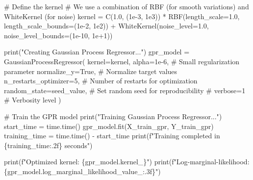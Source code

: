 \documentclass[
  letterpaper,
  DIV=11,
  numbers=noendperiod]{scrreprt}
\newenvironment{Shaded}{\begin{snugshade}}{\end{snugshade}}
\newcommand{\BuiltInTok}[1]{\textcolor[rgb]{0.00,0.23,0.31}{#1}}
\newcommand{\CommentTok}[1]{\textcolor[rgb]{0.37,0.37,0.37}{#1}}
\newcommand{\DecValTok}[1]{\textcolor[rgb]{0.68,0.00,0.00}{#1}}
\newcommand{\FloatTok}[1]{\textcolor[rgb]{0.68,0.00,0.00}{#1}}
\newcommand{\NormalTok}[1]{\textcolor[rgb]{0.00,0.23,0.31}{#1}}
\newcommand{\OperatorTok}[1]{\textcolor[rgb]{0.37,0.37,0.37}{#1}}
\newcommand{\SpecialCharTok}[1]{\textcolor[rgb]{0.37,0.37,0.37}{#1}}
\newcommand{\SpecialStringTok}[1]{\textcolor[rgb]{0.13,0.47,0.30}{#1}}
\newcommand{\StringTok}[1]{\textcolor[rgb]{0.13,0.47,0.30}{#1}}
\newcommand{\VariableTok}[1]{\textcolor[rgb]{0.07,0.07,0.07}{#1}}
\begin{document}
\begin{Shaded}
\begin{Highlighting}[]
\CommentTok{\# Define the kernel}
\CommentTok{\# We use a combination of RBF (for smooth variations) and WhiteKernel (for noise)}
\NormalTok{kernel }\OperatorTok{=}\NormalTok{ C(}\FloatTok{1.0}\NormalTok{, (}\FloatTok{1e{-}3}\NormalTok{, }\FloatTok{1e3}\NormalTok{)) }\OperatorTok{*}\NormalTok{ RBF(length\_scale}\OperatorTok{=}\FloatTok{1.0}\NormalTok{, length\_scale\_bounds}\OperatorTok{=}\NormalTok{(}\FloatTok{1e{-}2}\NormalTok{, }\FloatTok{1e2}\NormalTok{)) }\OperatorTok{+}\NormalTok{ WhiteKernel(noise\_level}\OperatorTok{=}\FloatTok{1.0}\NormalTok{, noise\_level\_bounds}\OperatorTok{=}\NormalTok{(}\FloatTok{1e{-}10}\NormalTok{, }\FloatTok{1e+1}\NormalTok{))}

\BuiltInTok{print}\NormalTok{(}\StringTok{"Creating Gaussian Process Regressor..."}\NormalTok{)}
\NormalTok{gpr\_model }\OperatorTok{=}\NormalTok{ GaussianProcessRegressor(}
\NormalTok{    kernel}\OperatorTok{=}\NormalTok{kernel,}
\NormalTok{    alpha}\OperatorTok{=}\FloatTok{1e{-}6}\NormalTok{,  }\CommentTok{\# Small regularization parameter}
\NormalTok{    normalize\_y}\OperatorTok{=}\VariableTok{True}\NormalTok{,  }\CommentTok{\# Normalize target values}
\NormalTok{    n\_restarts\_optimizer}\OperatorTok{=}\DecValTok{5}\NormalTok{,  }\CommentTok{\# Number of restarts for optimization}
\NormalTok{    random\_state}\OperatorTok{=}\NormalTok{seed\_value,  }\CommentTok{\# Set random seed for reproducibility}
    \CommentTok{\# verbose=1  \# Verbosity level}
\NormalTok{)}

\CommentTok{\# Train the GPR model}
\BuiltInTok{print}\NormalTok{(}\StringTok{"Training Gaussian Process Regressor..."}\NormalTok{)}
\NormalTok{start\_time }\OperatorTok{=}\NormalTok{ time.time()}
\NormalTok{gpr\_model.fit(X\_train\_gpr, Y\_train\_gpr)}
\NormalTok{training\_time }\OperatorTok{=}\NormalTok{ time.time() }\OperatorTok{{-}}\NormalTok{ start\_time}
\BuiltInTok{print}\NormalTok{(}\SpecialStringTok{f"Training completed in }\SpecialCharTok{\{}\NormalTok{training\_time}\SpecialCharTok{:.2f\}}\SpecialStringTok{ seconds"}\NormalTok{)}

\BuiltInTok{print}\NormalTok{(}\SpecialStringTok{f"Optimized kernel: }\SpecialCharTok{\{}\NormalTok{gpr\_model}\SpecialCharTok{.}\NormalTok{kernel\_}\SpecialCharTok{\}}\SpecialStringTok{"}\NormalTok{)}
\BuiltInTok{print}\NormalTok{(}\SpecialStringTok{f"Log{-}marginal{-}likelihood: }\SpecialCharTok{\{}\NormalTok{gpr\_model}\SpecialCharTok{.}\NormalTok{log\_marginal\_likelihood\_value\_}\SpecialCharTok{:.3f\}}\SpecialStringTok{"}\NormalTok{)}
\end{Highlighting}
\end{Shaded}
\end{document}
